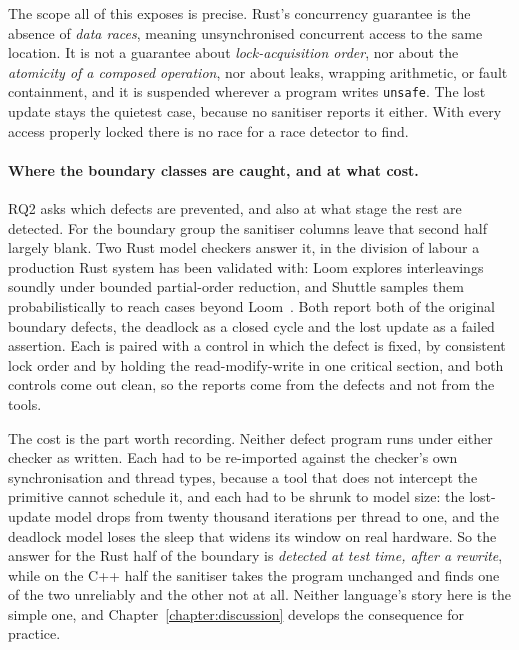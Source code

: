 \documentclass[english,oneside,a4paper,censored,csm,software-track-2020]{HYthesisML}
\begin{document}
The scope all of this exposes is precise. Rust's concurrency guarantee is the absence of
\emph{data races}, meaning unsynchronised concurrent access to the same location. It is not a
guarantee about \emph{lock-acquisition order}, nor about the \emph{atomicity of a composed
operation}, nor about leaks, wrapping arithmetic, or fault containment, and it is suspended
wherever a program writes \texttt{unsafe}. The lost update stays the quietest case, because no
sanitiser reports it either. With every access properly locked there is no race for a race
detector to find.

\paragraph{Where the boundary classes are caught, and at what cost.}
RQ2 asks which defects are prevented, and also at what stage the rest are detected. For
the boundary group the sanitiser columns leave that second half largely blank. Two Rust model
checkers answer it, in the division of labour a production Rust system has been validated
with: Loom explores interleavings soundly under bounded partial-order reduction, and Shuttle
samples them probabilistically to reach cases beyond Loom~\cite{bornholt2021shardstore}. Both
report both of the original boundary defects, the deadlock as a closed cycle and the lost update
as a failed assertion. Each is paired with a control in which the defect is fixed, by consistent
lock order and by holding the read-modify-write in one critical section, and both controls come
out clean, so the reports come from the defects and not from the tools.

The cost is the part worth recording. Neither defect program runs under either checker as
written. Each had to be re-imported against the checker's own synchronisation and thread types,
because a tool that does not intercept the primitive cannot schedule it, and each had to be
shrunk to model size: the lost-update model drops from twenty thousand iterations per thread to
one, and the deadlock model loses the sleep that widens its window on real hardware. So the
answer for the Rust half of the boundary is \emph{detected at test time, after a rewrite}, while
on the C++ half the sanitiser takes the program unchanged and finds one of the two unreliably and
the other not at all. Neither language's story here is the simple one, and
Chapter~\ref{chapter:discussion} develops the consequence for practice.
\end{document}

